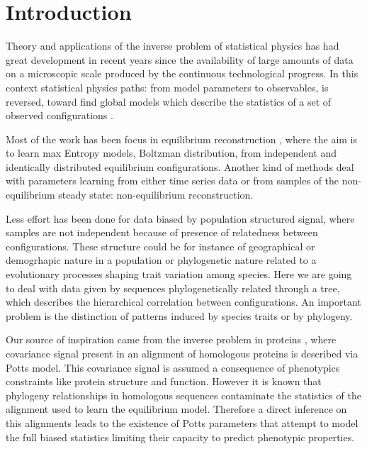 \documentclass[reprint,amsmath,amssymb,superscriptaddress,showpacs,pre]{revtex4-1}
\begin{document}
\maketitle


\section{\label{sec:int} Introduction}
Theory and applications of the inverse problem of statistical physics has had great development in recent years since the availability of large amounts of data on a microscopic scale produced by the continuous technological progress. In this context statistical physics paths: from model parameters to  observables, is reversed, toward find global models which describe the statistics of  a set of observed  configurations \cite{Inverse_problem_Berg}. 

Most of the work has been focus in equilibrium reconstruction , where the aim is to learn max Entropy models, Boltzman distribution, from independent and identically distributed equilibrium configurations. Another kind of methods deal with parameters learning from either time series data or from samples of the non-equilibrium steady state: non-equilibrium reconstruction.

Less effort has been done for data biased by population structured signal, where  samples  are not independent because of presence of relatedness between configurations. These structure could be for instance of  geographical or demogrhapic  nature in a population or  phylogenetic  nature  related to a evolutionary processes shaping trait variation among species.  Here we are going to deal with data given by sequences phylogenetically related  through a tree, which describes the hierarchical correlation between configurations. An important problem is the  distinction   of patterns induced by species traits or by phylogeny. 

Our source of inspiration came from the inverse problem in proteins \cite{Inverse_problem_proteins}, where  covariance signal present in an alignment of homologous proteins is described via Potts model. This covariance signal is assumed a consequence of phenotypics constraints like protein structure and function. However it is known that phylogeny relationships in homologous sequences  contaminate the statistics of  the alignment used to learn the equilibrium model. Therefore a direct inference on this alignments  leads to the existence of Potts parameters that attempt to model the full biased statistics limiting their capacity to predict phenotypic properties.
\end{document}
